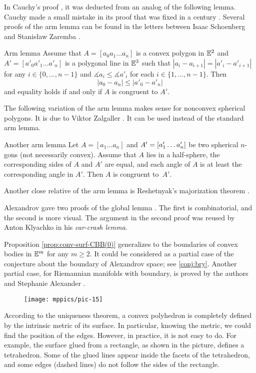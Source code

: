 In Cauchy's proof \cite{cauchy}, it was deducted from an analog of the following lemma.
Cauchy made a small mistake in its proof that was fixed in a century \cite{sabitov}.
Several proofs of the arm lemma can be found in the letters between Isaac Schoenberg and Stanisław Zaremba \cite{schoenberg-zaremba}.

\begin{thm}{Arm lemma}\label{lem:arm}
Assume that $A=[a_0 a_1\dots a_n]$ is a convex polygon in $\mathbb{E}^2$
and $A'=[a'_0 a'_1\dots a'_n]$ is a polygonal line in $\mathbb{E}^3$
such that
$|a_i-a_{i+1}|=|a'_i-a'_{i+1}|$ for any $i\in\{0,\dots,n-1\}$
and
$\measuredangle a_i\le \measuredangle a'_i$
for each $i\in\{1,\dots,n-1\}$.
Then
$$|a_0-a_n|\le |a'_0-a'_n|$$
and equality holds if and only if $A$ is congruent to $A'$.
\end{thm}

The following variation of the arm lemma makes sense for nonconvex spherical polygons.
It is due to Viktor Zalgaller \cite{zalgaller}.
It can be used instead of the standard arm lemma.

\begin{thm}{Another arm lemma}
Let $A=[a_1\dots a_n]$ and $A'=[a'_1\dots a'_n]$ be two spherical $n$-gons (not necessarily convex).
Assume that $A$ lies in a half-sphere,
the corresponding sides of $A$ and $A'$ are equal,
and each angle of $A$ is at least the corresponding angle in $A'$.
Then $A$ is congruent to~$A'$.
\end{thm}

Another close relative of the arm lemma is Reshetnyak's majorization theorem \cite{reshetnyak}.

Alexandrov gave two proofs of the global lemma \cite[2.1.2 and 2.1.3]{alexandrov}.
The first is combinatorial, and the second is more visual.
The argument in the second proof was reused by Anton Klyachko \cite{klyachko} in his \emph{car-crash lemma}.

Proposition \ref{prop:conv-surf-CBB(0)} generalizes to the boundaries of convex bodies  in $\mathbb{E}^m$ for any $m\ge 2$.
It could be considered as a partial case of the conjecture about the boundary of Alexandrov space; see \ref{conj:bry}.
Another partial case, for Riemannian manifolds with boundary, is proved by the authors and Stephanie Alexander \cite{alexander-kapovitch-petrunin-2008}.


\begin{wrapfigure}{r}{30mm}
\vskip-3mm
\centering
\texttt{[image: mppics/pic-15]}
\vskip-0mm
\end{wrapfigure}

According to the uniqueness theorem, a convex polyhedron is completely defined by the intrinsic metric of its surface.
In particular, knowing the metric, we could find the position of the edges.
However, in practice, it is not easy to do.
For example, the surface glued from a rectangle, as shown in the picture, defines a tetrahedron.
Some of the glued lines appear inside the facets of the tetrahedron, and some edges (dashed lines) do not follow the sides of the rectangle.

